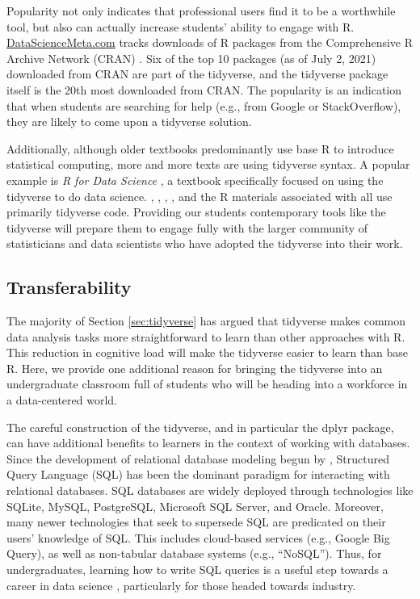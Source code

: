 \documentclass[12pt]{article}
\begin{document}
Popularity not only indicates that professional users find it to be a
worthwhile tool, but also can actually increase students' ability to
engage with R.
\href{http://www.datasciencemeta.com/rpackages}{DataScienceMeta.com}
tracks downloads of R packages from the Comprehensive R Archive Network
(CRAN) \citep{Rlang}. Six of the top 10 packages (as of July 2, 2021)
downloaded from CRAN are part of the tidyverse, and the tidyverse
package itself is the 20th most downloaded from CRAN. The popularity is
an indication that when students are searching for help (e.g., from
Google or StackOverflow), they are likely to come upon a tidyverse
solution.

Additionally, although older textbooks predominantly use base R to
introduce statistical computing, more and more texts are using tidyverse
syntax. A popular example is \emph{R for Data Science}
\citep{wickham2016r}, a textbook specifically focused on using the
tidyverse to do data science. \citet{ismay2019statistical},
\citet{baumer2021mdsr}, \citet{robacklegler2021},
\citet{hyndmanathanasopoulos2021}, and the R materials associated with
\citet{cetinkaya_hardin_2021} all use primarily tidyverse code.
Providing our students contemporary tools like the tidyverse will
prepare them to engage fully with the larger community of statisticians
and data scientists who have adopted the tidyverse into their work.

\hypertarget{sec:shared-syntax}{%
\subsection{Transferability}\label{sec:shared-syntax}}

The majority of Section \ref{sec:tidyverse} has argued that tidyverse
makes common data analysis tasks more straightforward to learn than
other approaches with R. This reduction in cognitive load will make the
tidyverse easier to learn than base R. Here, we provide one additional
reason for bringing the tidyverse into an undergraduate classroom full
of students who will be heading into a workforce in a data-centered
world.

The careful construction of the tidyverse, and in particular the dplyr
package, can have additional benefits to learners in the context of
working with databases. Since the development of relational database
modeling begun by \citet{codd1970database}, Structured Query Language
(SQL) has been the dominant paradigm for interacting with relational
databases. SQL databases are widely deployed through technologies like
SQLite, MySQL, PostgreSQL, Microsoft SQL Server, and Oracle. Moreover,
many newer technologies that seek to supersede SQL are predicated on
their users' knowledge of SQL. This includes cloud-based services (e.g.,
Google Big Query), as well as non-tabular database systems (e.g.,
``NoSQL''). Thus, for undergraduates, learning how to write SQL queries
is a useful step towards a career in data science
\citep{horton2015taking}, particularly for those headed towards
industry.
\end{document}
